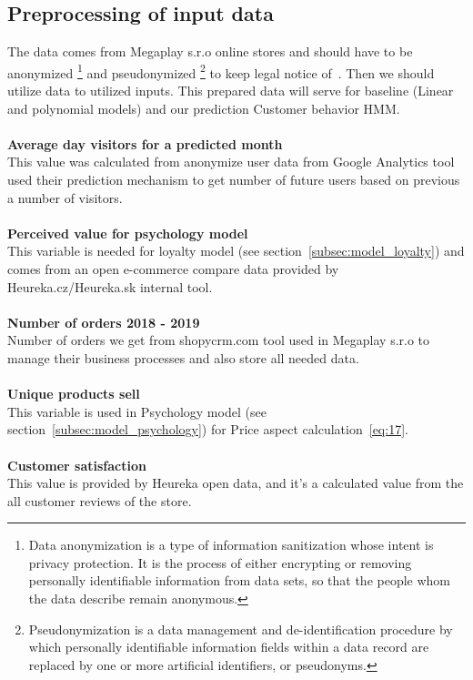 \subsection{Preprocessing of input data} \label{sec:preprocessing}
The data comes from Megaplay s.r.o online stores and should have to be\\ anonymized \footnote{Data anonymization is a type of information sanitization whose intent is privacy protection.
It is the process of either encrypting or removing personally identifiable information from data sets, so that
the people whom the data describe remain anonymous.} and pseudonymized \footnote{Pseudonymization is a data management
and de-identification procedure by which personally identifiable information fields within a data record are replaced
by one or more artificial identifiers, or pseudonyms.} to keep legal notice of~\cite{gdpr}.
Then we should utilize data to utilized inputs.
This prepared data will serve for baseline (Linear and polynomial models) and our prediction Customer behavior HMM.\\
\\
\textbf{Average day visitors for a predicted month}\\
This value was calculated from anonymize user data from Google Analytics tool used their prediction mechanism to get number of future users based on previous a number of visitors.\\
\\
\textbf{Perceived value for psychology model} \label{perceived}\\
This variable is needed for loyalty model (see section~\ref{subsec:model_loyalty}) and comes from an open e-commerce compare data provided by Heureka.cz/Heureka.sk internal tool.\\
\\
\textbf{Number of orders 2018 - 2019}\\
Number of orders we get from shopycrm.com tool used in Megaplay s.r.o to manage their business processes and also store all needed data.\\
\\
\textbf{Unique products sell}\\
This variable is used in Psychology model (see section~\ref{subsec:model_psychology}) for Price aspect calculation~\ref{eq:17}.\\
\\
\textbf{Customer satisfaction} \label{customerSat}\\
This value is provided by Heureka open data, and it's a calculated value from the all customer reviews of the store.\\
